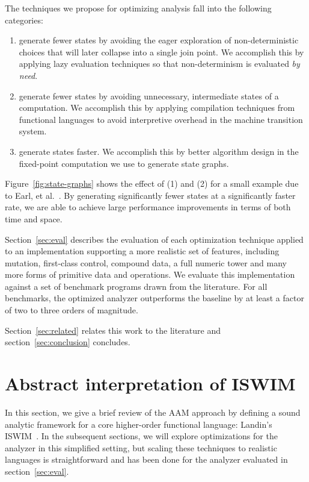 \documentclass[preprint,onecolumn,9pt]{sigplanconf} %
\begin{document}
The techniques we propose for optimizing analysis fall into the
following categories:
\begin{enumerate}
\item generate fewer states by avoiding the eager exploration of
  non-deterministic choices that will later collapse into a single
  join point.  We accomplish this by applying lazy evaluation
  techniques so that non-determinism is evaluated \emph{by need}.

\item generate fewer states by avoiding unnecessary, intermediate
  states of a computation.  We accomplish this by applying compilation
  techniques from functional languages to avoid interpretive overhead
  in the machine transition system.

\item generate states faster.  We accomplish this by better algorithm
  design in the fixed-point computation we use to generate state graphs.
\end{enumerate}
Figure~\ref{fig:state-graphs} shows the effect of (1) and (2) for a
small example due to Earl, et
al.~\cite{dvanhorn:Earl2012Introspective}.
By generating significantly fewer states at a significantly faster
rate, we are able to achieve large performance improvements in terms
of both time and space.

Section~\ref{sec:eval} describes the evaluation of each optimization
technique applied to an implementation supporting a more realistic set
of features, including mutation, first-class control, compound data, a
full numeric tower and many more forms of primitive data and
operations.
%
We evaluate this implementation against a set of benchmark programs
drawn from the literature.
%
For all benchmarks, the optimized analyzer outperforms the baseline
by at least a factor of
two to
three orders of magnitude.

Section~\ref{sec:related} relates this work to the literature and
section~\ref{sec:conclusion} concludes.

\section{Abstract interpretation of ISWIM}
\label{sec:aam}

In this section, we give a brief review of the AAM approach by
defining a sound analytic framework for a core higher-order functional
language: Landin's ISWIM~\cite{dvanhorn:Landin1966Next}.  In the
subsequent sections, we will explore optimizations for the analyzer in
this simplified setting, but scaling these techniques to realistic
languages is straightforward and has been done for the analyzer
evaluated in section~\ref{sec:eval}.
\end{document}
